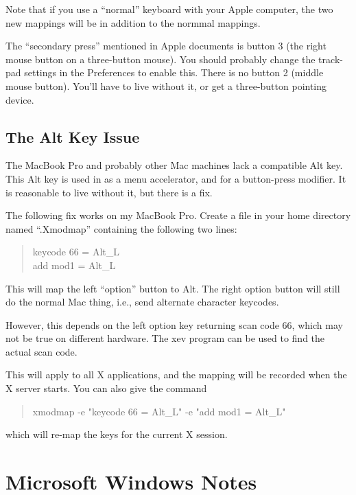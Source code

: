 Note that if you use a ``normal'' keyboard with your Apple computer,
the two new mappings will be in addition to the normmal mappings.

The ``secondary press'' mentioned in Apple documents is button 3 (the
right mouse button on a three-button mouse).  You should probably
change the track-pad settings in the {\cb Preferences} to enable this. 
There is no button 2 (middle mouse button).  You'll have to live
without it, or get a three-button pointing device.

\subsection{The Alt Key Issue}

The MacBook Pro and probably other Mac machines lack a compatible {\kb
Alt} key.  This {\kb Alt} key is used in {\Xic} as a menu accelerator,
and for a button-press modifier.  It is reasonable to live without it,
but there is a fix.

The following fix works on my MacBook Pro.  Create a file in your home
directory named ``{\vt .Xmodmap}'' containing the following two lines:

\begin{quote}\vt
keycode 66 = Alt\_L\\
add mod1 = Alt\_L
\end{quote}

This will map the left ``option'' button to {\kb Alt}.  The right
option button will still do the normal Mac thing, i.e., send alternate
character keycodes.

However, this depends on the left option key returning scan code 66,
which may not be true on different hardware.  The {\vt xev} program
can be used to find the actual scan code.

This will apply to all X applications, and the mapping will be
recorded when the X server starts.  You can also give the command
\begin{quote}
\vt xmodmap -e "keycode 66 = Alt\_L" -e "add mod1 = Alt\_L"
\end{quote}
which will re-map the keys for the current X session.


\section{Microsoft Windows Notes}

